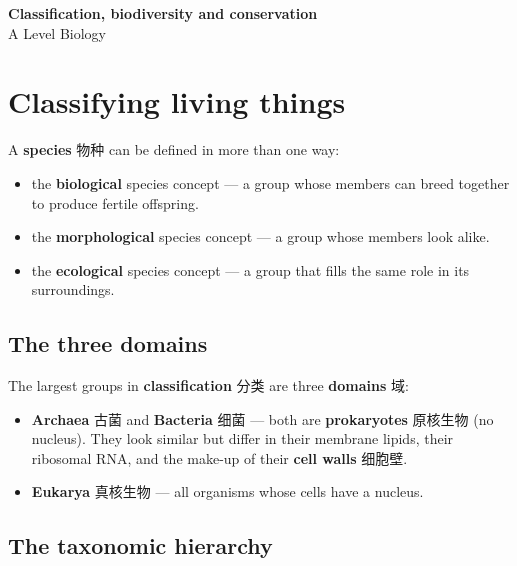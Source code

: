 \documentclass[11pt]{article}
\begin{document}
\begin{center}
  {\LARGE\bfseries Classification, biodiversity and conservation}\\[0.35em]
  {\large A Level Biology}
\end{center}
\vspace{0.6em}

\section*{Classifying living things}

A \textbf{species} 物种 can be defined in more than one way:

\begin{itemize}
\item the \textbf{biological} species concept — a group whose members can breed together to produce fertile offspring.

\item the \textbf{morphological} species concept — a group whose members look alike.

\item the \textbf{ecological} species concept — a group that fills the same role in its surroundings.

\end{itemize}

\subsection*{The three domains}

The largest groups in \textbf{classification} 分类 are three \textbf{domains} 域:

\begin{itemize}
\item \textbf{Archaea} 古菌 and \textbf{Bacteria} 细菌 — both are \textbf{prokaryotes} 原核生物 (no nucleus). They look similar but differ in their membrane lipids, their ribosomal RNA, and the make-up of their \textbf{cell walls} 细胞壁.

\item \textbf{Eukarya} 真核生物 — all organisms whose cells have a nucleus.

\end{itemize}

\subsection*{The taxonomic hierarchy}
\end{document}
